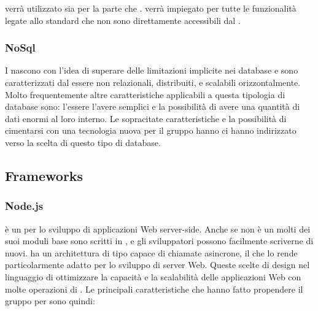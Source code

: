 \documentclass[12pt,a4paper]{article}
\begin{document}
 verrà utilizzato sia per la parte  che .  verrà impiegato per tutte le funzionalità legate allo standard  che non sono direttamente accessibili dal  .

\subsubsection{NoSql}\label{nosql}
I   nascono con l'idea di superare delle limitazioni implicite nei database  e sono caratterizzati dal essere non relazionali, distribuiti,  e scalabili orizzontalmente. Molto frequentemente altre caratteristiche applicabili a questa tipologia di database sono: l'essere  l'avere  semplici e la possibilità di avere una quantità di dati enormi al loro interno. Le sopracitate caratteristiche e la possibilità di cimentarsi con una tecnologia nuova per il gruppo hanno ci hanno indirizzato verso la scelta di questo tipo di database.

\subsection{Frameworks}

\subsubsection{Node.js}\label{node.js}
 è un   per lo sviluppo di applicazioni Web server-side. Anche se  non è un   molti dei suoi moduli base  sono scritti in , e gli sviluppatori possono facilmente scriverne di nuovi.  ha un architettura di tipo  capace di chiamate  asincrone, il che lo rende particolarmente adatto per lo sviluppo di server Web. Queste scelte di design nel linguaggio di ottimizzare la capacità e la scalabilità delle applicazioni Web con molte operazioni di .
Le principali caratteristiche che hanno fatto propendere il gruppo per  sono quindi:
\end{document}
